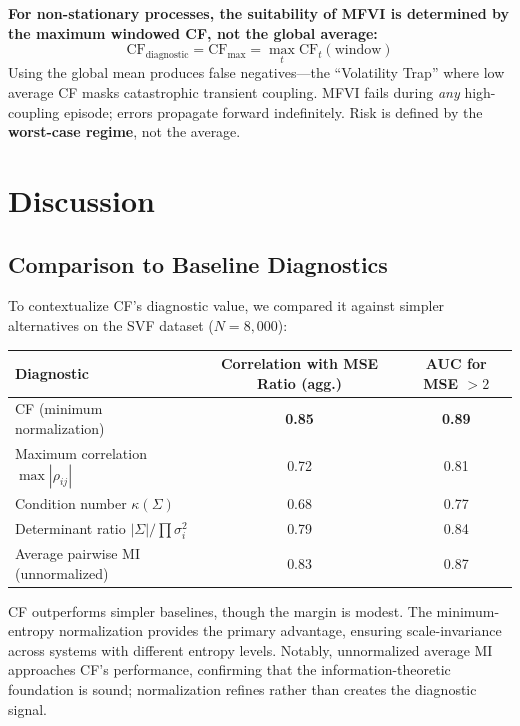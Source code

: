 \documentclass[10pt]{article} %
\theoremstyle{plain}
\theoremstyle{definition}
\begin{document}
\begin{tcolorbox}[breakable, colback=red!5, colframe=red!50!black, title=\textbf{The Maximal Coupling Rule}, fonttitle=\bfseries]
\textbf{For non-stationary processes, the suitability of MFVI is determined by the maximum windowed CF, not the global average:}
\begin{equation}
\text{CF}_{\text{diagnostic}} = \text{CF}_{\max} = \max_t \text{CF}_t(\text{window})
\end{equation}
Using the global mean produces false negatives---the ``Volatility Trap'' where low average CF masks catastrophic transient coupling. MFVI fails during \emph{any} high-coupling episode; errors propagate forward indefinitely. Risk is defined by the \textbf{worst-case regime}, not the average.
\end{tcolorbox}

\section{Discussion}
\label{sec:discussion}

\subsection{Comparison to Baseline Diagnostics}

To contextualize CF's diagnostic value, we compared it against simpler alternatives on the SVF dataset ($N = 8{,}000$):

\begin{center}
\begin{tabular}{lcc}
\toprule
Diagnostic & Correlation with MSE Ratio (agg.) & AUC for MSE $> 2$ \\
\midrule
CF (minimum normalization) & \textbf{0.85} & \textbf{0.89} \\
Maximum correlation $\max|\rho_{ij}|$ & 0.72 & 0.81 \\
Condition number $\kappa(\Sigma)$ & 0.68 & 0.77 \\
Determinant ratio $|\Sigma|/\prod \sigma_i^2$ & 0.79 & 0.84 \\
Average pairwise MI (unnormalized) & 0.83 & 0.87 \\
\bottomrule
\end{tabular}
\end{center}

\noindent CF outperforms simpler baselines, though the margin is modest. The minimum-entropy normalization provides the primary advantage, ensuring scale-invariance across systems with different entropy levels. Notably, unnormalized average MI approaches CF's performance, confirming that the information-theoretic foundation is sound; normalization refines rather than creates the diagnostic signal.
\end{document}
